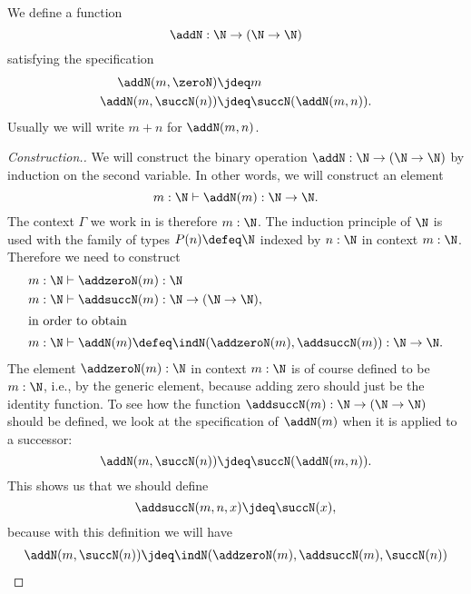 \begin{defn}\label{defn:addN}
  We define a function
  \begin{equation*}
    \addN:\N\to (\N\to\N)
  \end{equation*}
  satisfying the specification
  \begin{align*}
    \addN(m,\zeroN) & \jdeq m \\
    \addN(m,\succN(n)) & \jdeq \succN(\addN(m,n)).
  \end{align*}
  Usually we will write $m+n$ for $\addN(m,n)$.
\end{defn}

\begin{proof}[Construction.]
  We will construct the binary operation $\addN:\N\to(\N\to\N)$ by induction on the second variable. In other words, we will construct an element
  \begin{equation*}
    m:\N \vdash \addN(m):\N\to\N.
  \end{equation*}
  The context $\Gamma$ we work in is therefore $m:\N$. The induction principle of $\N$ is used with the family of types $P(n)\defeq \N$ indexed by $n:\N$ in context $m:\N$. Therefore we need to construct
  \begin{align*}
    m:\N & \vdash \addzeroN(m) : \N\\
    m:\N & \vdash \addsuccN(m) : \N\to(\N\to\N),\\
    \intertext{in order to obtain}
    m:\N & \vdash \addN(m)\defeq\indN(\addzeroN(m),\addsuccN(m)):\N\to\N.
  \end{align*}
  The element $\addzeroN(m):\N$ in context $m:\N$ is of course defined to be $m:\N$, i.e., by the generic element, because adding zero should just be the identity function.
  To see how the function $\addsuccN(m):\N\to(\N\to\N)$ should be defined, we look at the specification of $\addN(m)$ when it is applied to a successor:
  \begin{equation*}
    \addN(m,\succN(n))\jdeq \succN(\addN(m,n)).
  \end{equation*}
  This shows us that we should define
  \begin{equation*}
    \addsuccN(m,n,x)\jdeq \succN(x),
  \end{equation*}
  because with this definition we will have
  \begin{align*}
    \addN(m,\succN(n)) & \jdeq \indN(\addzeroN(m),\addsuccN(m),\succN(n)) \\

\end{align*}
\end{proof}
